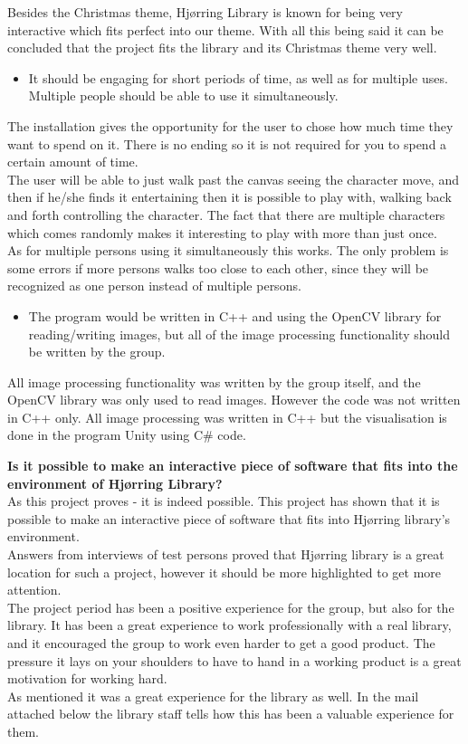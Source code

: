 Besides the Christmas theme, Hj{\o}rring Library is known for being very interactive which fits perfect into our theme. With all this being said it can be concluded that the project fits the library and its Christmas theme very well.

\begin{itemize}
\item It should be engaging for short periods of time, as well as for multiple uses. Multiple people should be able to use it simultaneously.
\end{itemize}
The installation gives the opportunity for the user to chose how much time they want to spend on it. There is no ending so it is not required for you to spend a certain amount of time. \\
The user will be able to just walk past the canvas seeing the character move, and then if he/she finds it entertaining then it is possible to play with, walking back and forth controlling the character. The fact that there are multiple characters which comes randomly makes it interesting to play with more than just once.\\
As for multiple persons using it simultaneously this works. The only problem is some errors if more persons walks too close to each other, since they will be recognized as one person instead of multiple persons.

\begin{itemize}
\item The program would be written in C++ and using the OpenCV library for reading/writing images, but all of the image processing functionality should be written by the group.
\end{itemize}
All image processing functionality was written by the group itself, and the OpenCV library was only used to read images. However the code was not written in C++ only. All image processing was written in C++ but the visualisation is done in the program Unity using C\# code.

\textbf{Is it possible to make an interactive piece of software that fits into the environment of Hj{\o}rring Library?}\\
As this project proves - it is indeed possible. This project has shown that it is possible to make an interactive piece of software that fits into Hj{\o}rring library's environment.\\
Answers from interviews of test persons proved that Hj{\o}rring library is a great location for such a project, however it should be more highlighted to get more attention. \\
The project period has been a positive experience for the group, but also for the library. It has been a great experience to work professionally with a real library, and it encouraged the group to work even harder to get a good product. The pressure it lays on your shoulders to have to hand in a working product is a great motivation for working hard. \\
As mentioned it was a great experience for the library as well. In the mail attached below the library staff tells how this has been a valuable experience for them.

